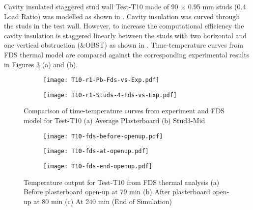 Cavity insulated staggered stud wall Test-T10 made of 90 $\times$ 0.95 mm studs (0.4 Load Ratio) was modelled as shown in . Cavity insulation was curved through the studs in the test wall. However, to increase the computational efficiency the cavity insulation is staggered linearly between the studs with two horizontal and one vertical obstruction (\&OBST) as shown in . Time-temperature curves from FDS thermal model are compared against the corresponding experimental results in Figures \ref{fig:fds-output-pb-studs-t10} (a) and (b).
\begin{figure}[!htbp]
	\centering
	\begin{subfigure}[b]{0.7\textwidth}
		\centering
		\texttt{[image: T10-r1-Pb-Fds-vs-Exp.pdf]}
		\caption{}
		\label{subfig:T10-r1-Pb-Fds-vs-Exp}
	\end{subfigure}
	\begin{subfigure}[b]{0.6\textwidth}
		\centering
		\texttt{[image: T10-r1-Studs-4-Fds-vs-Exp.pdf]}
		\caption{}
		\label{subfig:T10-r1-Studs-4-Fds-vs-Exp}
	\end{subfigure}
	   \caption{Comparison of time-temperature curves from experiment and FDS model for Test-T10 (a) Average Plasterboard (b) Stud3-Mid}
	   \label{fig:fds-output-pb-studs-t10}
\end{figure}
\begin{figure}[!htbp]
	\centering
	\begin{subfigure}[b]{0.45\textwidth}
		\centering
		\texttt{[image: T10-fds-before-openup.pdf]}
		\caption{}
		\label{subfig:T10-fds-before-openup}
	\end{subfigure}
	\begin{subfigure}[b]{0.45\textwidth}
		\centering
		\texttt{[image: T10-fds-at-openup.pdf]}
		\caption{}
		\label{subfig:T10-fds-at-openup}
	\end{subfigure}
	\begin{subfigure}[b]{0.45\textwidth}
		\centering
		\texttt{[image: T10-fds-end-openup.pdf]}
		\caption{}
		\label{subfig:T10-fds-end-openup}
	\end{subfigure}
	   \caption{Temperature output for Test-T10 from FDS thermal analysis (a) Before plasterboard open-up at 79 min (b) After plasterboard open-up at 80 min (c) At 240 min (End of Simulation)}
	   \label{fig:T10-fds-output}
\end{figure}

